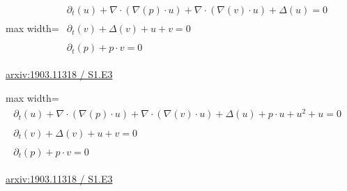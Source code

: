 \documentclass[10pt,a4paper]{article}
\begin{document}
\begin{minipage}{\linewidth}
\begin{center}\begin{adjustbox}{max width=\linewidth}$\displaystyle\begin{gathered}\begin{gathered}\partial_{t}(u)+\nabla\cdot(\nabla(p)\cdot u)+\nabla\cdot(\nabla(v)\cdot u)+\Delta(u)=0\end{gathered}\\[5pt]\begin{gathered}\partial_{t}(v)+\Delta(v)+u+v=0\end{gathered}\\[5pt]\begin{gathered}\partial_{t}(p)+p\cdot v=0\end{gathered}\end{gathered}$\end{adjustbox}\end{center}
{\small \href{https://arxiv.org/html/1903.11318#S1.E3}{arxiv:1903.11318 / S1.E3}}\par
\end{minipage}\par\vspace{7mm}

\begin{minipage}{\linewidth}
\begin{center}\begin{adjustbox}{max width=\linewidth}$\displaystyle\begin{gathered}\begin{gathered}\partial_{t}(u)+\nabla\cdot(\nabla(p)\cdot u)+\nabla\cdot(\nabla(v)\cdot u)+\Delta(u)+p\cdot u+u^{2}+u=0\end{gathered}\\[5pt]\begin{gathered}\partial_{t}(v)+\Delta(v)+u+v=0\end{gathered}\\[5pt]\begin{gathered}\partial_{t}(p)+p\cdot v=0\end{gathered}\end{gathered}$\end{adjustbox}\end{center}
{\small \href{https://arxiv.org/html/1903.11318#S1.E3}{arxiv:1903.11318 / S1.E3}}\par
\end{minipage}\par\vspace{7mm}
\end{document}
